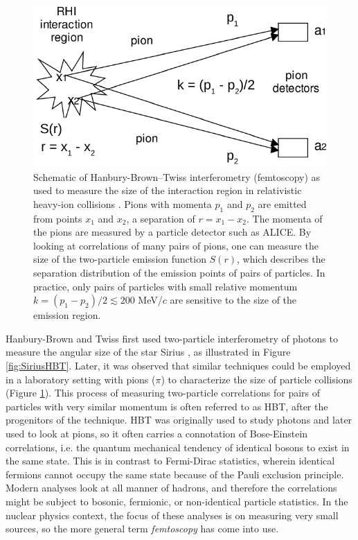 \begin{figure}[hbt]
\includegraphics[width=36pc]{Figures/BorrowedFigures/HeavyIonHBT.pdf}
\caption[Schematic of Hanbury-Brown--Twiss interferometry (femtoscopy) in heavy-ion collisions]{Schematic of Hanbury-Brown--Twiss interferometry (femtoscopy) as used to measure the size of the interaction region in relativistic heavy-ion collisions \cite{Humanic:2005ye}.
Pions with momenta $p_1$ and $p_2$ are emitted from points $x_1$ and $x_2$, a separation of $r = x_1 - x_2$. 
The momenta of the pions are measured by a particle detector such as ALICE.
By looking at correlations of many pairs of pions, one can measure the size of the two-particle emission function $S(r)$, which describes the separation distribution of the emission points of pairs of particles.
In practice, only pairs of particles with small relative momentum $k = (p_1 - p_2)/2 \lesssim 200$ MeV/$c$ are sensitive to the size of the emission region.
}
\label{fig:HeavyIonHBT}
\end{figure}

Hanbury-Brown and Twiss first used two-particle interferometry of photons to measure the angular size of the star Sirius \cite{HanburyBrown:1956bqd}, as illustrated in Figure \ref{fig:SiriusHBT}.
Later, it was observed that similar techniques could be employed in a laboratory setting with pions ($\pi$) to characterize the size of particle collisions \cite{Goldhaber:1960sf} (Figure \ref{fig:HeavyIonHBT}).
This process of measuring two-particle correlations for pairs of particles with very similar momentum is often referred to as HBT, after the progenitors of the technique.
HBT was originally used to study photons and later used to look at pions, so it often carries a connotation of Bose-Einstein correlations, i.e. the quantum mechanical tendency of identical bosons to exist in the same state. This is in contrast to Fermi-Dirac statistics, wherein identical fermions cannot occupy the same state because of the Pauli exclusion principle.
Modern analyses look at all manner of hadrons, and therefore the correlations might be subject to bosonic, fermionic, or non-identical particle statistics.
In the nuclear physics context, the focus of these analyses is on measuring very small sources, so the more general term \textit{femtoscopy} has come into use.

